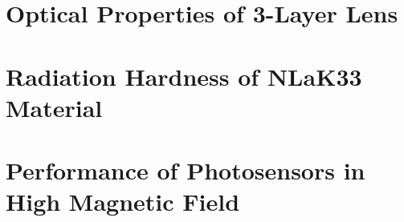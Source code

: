 \section{Optical Properties of 3-Layer Lens}
\section{Radiation Hardness of NLaK33 Material}
\section{Performance of Photosensors in High Magnetic Field}
